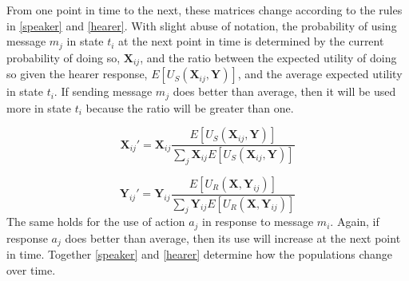 \documentclass[linguex]{sp}
\theoremstyle{definition} \newtheorem{definition}{Definition}
\begin{document}
From one point in time to the next, these matrices change according to the rules in \eqref{speaker} and \eqref{hearer}. With slight abuse of notation, the probability of using message $m_j$ in state $t_i$ at the next point in time is determined by the current probability of doing so, $\mathbf{X}_{ij}$, and the ratio between the expected utility of doing so given the hearer response, $E[U_S(\mathbf{X}_{ij}, \mathbf{Y})]$, and the average expected utility in state $t_i$. If sending message $m_j$ does better than average, then it will be used more in state $t_i$ because the ratio will be greater than one.

\begin{equation}
     \mathbf{X}_{ij}' = \mathbf{X}_{ij}\frac{E[U_S(\mathbf{X}_{ij}, \mathbf{Y})]}{\sum_j \mathbf{X}_{ij} E[U_S(\mathbf{X}_{ij}, \mathbf{Y})]}
     \label{speaker}
\end{equation}

\begin{equation}
     \mathbf{Y}_{ij}' = \mathbf{Y}_{ij}\frac{E[U_R(\mathbf{X}, \mathbf{Y}_{ij})]}{\sum_j \mathbf{Y}_{ij} E[U_R(\mathbf{X}, \mathbf{Y}_{ij})]}
          \label{hearer}
\end{equation}
The same holds for the use of action $a_j$ in response to message $m_i$. Again, if response $a_j$ does better than average, then its use will increase at the next point in time. Together  
\eqref{speaker} and \eqref{hearer} determine how the populations change over time.
\end{document}
